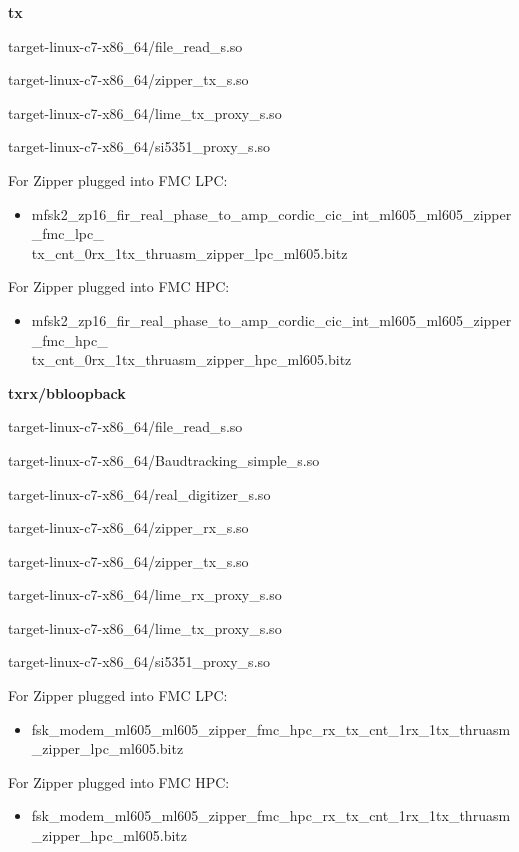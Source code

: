 	\noindent\textbf{tx}
	\begin{itemize}
	\begin{minipage}[t]{.5\textwidth}
	\item target-linux-c7-x86\_64/file\_read\_s.so
	\item target-linux-c7-x86\_64/zipper\_tx\_s.so
	\end{minipage}
	\begin{minipage}[t]{.5\textwidth}
	\item target-linux-c7-x86\_64/lime\_tx\_proxy\_s.so
	\item target-linux-c7-x86\_64/si5351\_proxy\_s.so
	\end{minipage}
	\end{itemize}
	For Zipper plugged into FMC LPC:
	\begin{itemize}
		\item mfsk2\_zp16\_fir\_real\_phase\_to\_amp\_cordic\_cic\_int\_ml605\_ml605\_zipper\_fmc\_lpc\_ \\
		tx\_cnt\_0rx\_1tx\_thruasm\_zipper\_lpc\_ml605.bitz
	\end{itemize}
	\noindent For Zipper plugged into FMC HPC:
	\begin{itemize}
		\item mfsk2\_zp16\_fir\_real\_phase\_to\_amp\_cordic\_cic\_int\_ml605\_ml605\_zipper\_fmc\_hpc\_ \\
		tx\_cnt\_0rx\_1tx\_thruasm\_zipper\_hpc\_ml605.bitz
	\end{itemize}

	\noindent\textbf{txrx/bbloopback}
	\begin{itemize}
	\begin{minipage}[t]{.5\textwidth}
	\item target-linux-c7-x86\_64/file\_read\_s.so
	\item target-linux-c7-x86\_64/Baudtracking\_simple\_s.so
	\item target-linux-c7-x86\_64/real\_digitizer\_s.so
	\item target-linux-c7-x86\_64/zipper\_rx\_s.so
	\end{minipage}
	\begin{minipage}[t]{.5\textwidth}
	\item target-linux-c7-x86\_64/zipper\_tx\_s.so
	\item target-linux-c7-x86\_64/lime\_rx\_proxy\_s.so
	\item target-linux-c7-x86\_64/lime\_tx\_proxy\_s.so
	\item target-linux-c7-x86\_64/si5351\_proxy\_s.so
	\end{minipage}
	\end{itemize}
	For Zipper plugged into FMC LPC:
	\begin{itemize}
		\item fsk\_modem\_ml605\_ml605\_zipper\_fmc\_hpc\_rx\_tx\_cnt\_1rx\_1tx\_thruasm\_zipper\_lpc\_ml605.bitz
	\end{itemize}
	\noindent For Zipper plugged into FMC HPC:
	\begin{itemize}
		\item fsk\_modem\_ml605\_ml605\_zipper\_fmc\_hpc\_rx\_tx\_cnt\_1rx\_1tx\_thruasm\_zipper\_hpc\_ml605.bitz
	\end{itemize}

